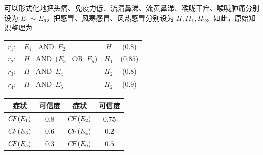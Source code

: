 \documentclass[UTF8]{ctexart}
\newcommand\AND{\  \textrm{AND}\ }
\newcommand\OR{\  \textrm{OR}\ }
\newcommand\CF{{C\hspace{-0.2em}F}}
\begin{document}
可以形式化地把头痛、免疫力低、流清鼻涕、流黄鼻涕、喉咙干痒、喉咙肿痛分别设为 $E_1\sim E_6$，把感冒、风寒感冒、风热感冒分别设为 $H,H_1,H_2$。如此，原始知识整理为

\BgThispage
\begin{table}[htb]
  \centering
  \begin{tabular}{c@{\quad IF\quad }l@{\quad THEN\quad }cc}
  $r_1:$ & $E_1$ \AND $E_2$ & $H$ & ($0.8$) \\
  $r_2:$ & $H$ \AND ($E_3$ \OR $E_5$) & $H_1$ & ($0.85$) \\
  $r_3:$ & $H$ \AND $E_4$ & $H_2$ & ($0.8$) \\
  $r_4:$ & $H$ \AND $E_6$ & $H_2$ & ($0.9$) \\
  \end{tabular}
\end{table}

\begin{table}[htb]
  \centering
  \begin{tabular}{cccc}
  \toprule
    症状 & 可信度 & 症状 & 可信度 \\
  \midrule
    $\CF(E_1)$ & $0.8$ & $\CF(E_2)$ & $0.75$ \\
    $\CF(E_3)$ & $0.6$ & $\CF(E_4)$ & $0.2$ \\
    $\CF(E_5)$ & $0.3$ & $\CF(E_6)$ & $0.5$ \\
  \bottomrule
  \end{tabular}
\end{table}
\end{document}
